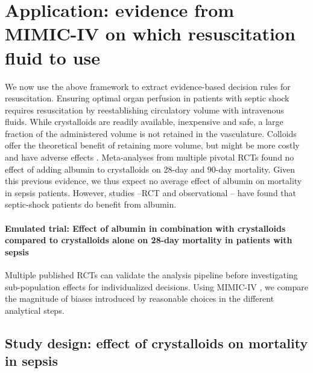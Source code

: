 \documentclass[10pt,letterpaper]{article}
\begin{document}
\section*{Application: evidence from MIMIC-IV on which resuscitation fluid to use}%
\label{sec:application_on_mimic_iv}

We now use the above framework to extract evidence-based decision rules for
resuscitation. Ensuring optimal organ perfusion in patients with septic shock
requires resuscitation by reestablishing circulatory volume with intravenous
fluids. While crystalloids are readily available, inexpensive and safe, a
large fraction of the administered volume is not retained in the vasculature.
Colloids offer the theoretical benefit of retaining more volume, but might be
more costly and have adverse effects \cite{annane2013effects}. Meta-analyses
from multiple pivotal RCTs found no effect of adding albumin to crystalloids
\cite{xu2014comparison,li2020resuscitation} on 28-day and 90-day mortality.  Given this
previous evidence, we thus expect no average effect of albumin on mortality in
sepsis patients. However, studies --RCT \cite{caironi2014albumin}  and observational
\cite{zhou2021early}-- have
found that septic-shock patients do benefit from albumin.

\paragraph{Emulated trial: Effect of albumin in combination with crystalloids
    compared to crystalloids alone on 28-day mortality in patients with sepsis}\label{emulated_trial}

Multiple published RCTs can validate the analysis pipeline before
investigating sub-population effects for individualized decisions. Using
MIMIC-IV \cite{johnson2020mimic}, we compare the magnitude of biases introduced by reasonable
choices in the different analytical steps.

\subsection*{Study design: effect of crystalloids on mortality in sepsis}%
\label{sec:framing_mimic_iv}
\end{document}
